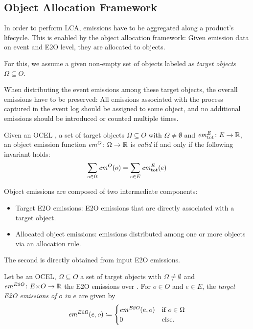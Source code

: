 \subsection{Object Allocation Framework}
\label{sec:alloc-framework}

In order to perform LCA, emissions have to be aggregated along a product's lifecycle. This is enabled by the object allocation framework: Given emission data on event and E2O level, they are allocated to objects.

For this, we assume a given non-empty set of objects labeled as \textit{target objects} $\Omega\subseteq O$.

When distributing the event emissions among these target objects, the overall emissions have to be preserved:
All emissions associated with the process captured in the event log should be assigned to some object, and no additional emissions should be introduced or counted multiple times.

\begin{definition}
  Given an OCEL \ocel, a set of target objects $\Omega \subseteq O$ with $\Omega \neq \emptyset$ and $\mathit{em}^E_{\text{tot}}\colon E\to\mathbb{R}$, an object emission function $\mathit{em}^O\colon\Omega\to\mathbb{R}$ is \textit{valid} if and only if the following invariant holds:
  \begin{equation*}
    \sum_{o \in \Omega} \mathit{em}^O(o) = \sum_{e \in E} \mathit{em}^E_{\text{tot}}(e)
  \end{equation*}
  \label{def:valid-obj-emissions}
\end{definition}

Object emissions are composed of two intermediate components:

\begin{itemize}
  \item Target E2O emissions: E2O emissions that are directly associated with a target object.
  \item Allocated object emissions: emissions distributed among one or more objects via an allocation rule.
\end{itemize}

The second is directly obtained from input E2O emissions.

\begin{definition}
  Let \ocel{} be an OCEL,  $\Omega \subseteq O$ a set of target objects with $\Omega \neq \emptyset$ and $\mathit{em}^{\mathit{E2O}}\colon E {\times} O\to\mathbb{R}$ the E2O emissions over \ocel.
  For $o \in O$ and $e\in E$, the \textit{target E2O emissions of $o$ in $e$} are given by
  \begin{equation*}
    \mathit{em}^{\mathit{E2\Omega}}(e, o) \coloneqq \begin{cases}
      \mathit{em}^{\mathit{E2O}}(e, o) & \text{if } o \in \Omega \\
      0 & \text{else}.
    \end{cases}
  \end{equation*}
\end{definition}

